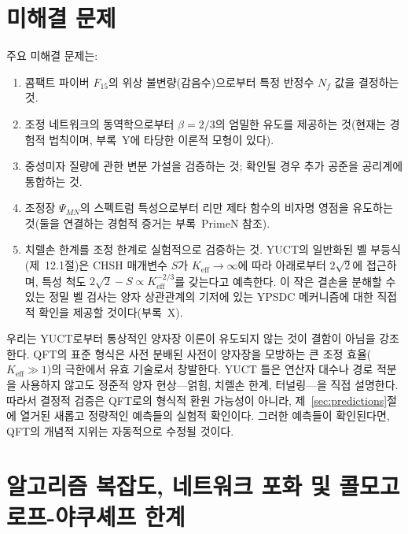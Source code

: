 \documentclass[12pt,a4paper]{article}
\theoremstyle{remark}
\begin{document}
	\section{미해결 문제}
	\label{sec:open}
	
	주요 미해결 문제는:
	
	\begin{enumerate}[label=(\roman*)]
		\item 콤팩트 파이버 \(F_{15}\)의 위상 불변량(감음수)으로부터 특정 반정수 \(N_f\) 값을 결정하는 것.
		\item 조정 네트워크의 동역학으로부터 \(\beta = 2/3\)의 엄밀한 유도를 제공하는 것(현재는 경험적 법칙이며, 부록~Y에 타당한 이론적 모형이 있다).
		\item 중성미자 질량에 관한 변분 가설을 검증하는 것; 확인될 경우 추가 공준을 공리계에 통합하는 것.
		\item 조정장 \(\Psi_{MN}\)의 스펙트럼 특성으로부터 리만 제타 함수의 비자명 영점을 유도하는 것(둘을 연결하는 경험적 증거는 부록~PrimeN 참조).
		\item 치렐손 한계를 조정 한계로 실험적으로 검증하는 것. YUCT의 일반화된 벨 부등식(제~12.1절)은 CHSH 매개변수 \(S\)가 \(K_{\mathrm{eff}} \to \infty\)에 따라 아래로부터 \(2\sqrt{2}\)에 접근하며, 특성 척도 \(2\sqrt{2} - S \propto K_{\mathrm{eff}}^{-2/3}\)를 갖는다고 예측한다. 이 작은 결손을 분해할 수 있는 정밀 벨 검사는 양자 상관관계의 기저에 있는 YPSDC 메커니즘에 대한 직접적 확인을 제공할 것이다(부록~X).
	\end{enumerate}
	
	우리는 YUCT로부터 통상적인 양자장 이론이 유도되지 않는 것이 결함이 아님을 강조한다. QFT의 표준 형식은 사전 분배된 사전이 양자장을 모방하는 큰 조정 효율(\(K_{\mathrm{eff}} \gg 1\))의 극한에서 유효 기술로서 창발한다. YUCT 틀은 연산자 대수나 경로 적분을 사용하지 않고도 정준적 양자 현상—얽힘, 치렐손 한계, 터널링—을 직접 설명한다. 따라서 결정적 검증은 QFT로의 형식적 환원 가능성이 아니라, 제~\ref{sec:predictions}절에 열거된 새롭고 정량적인 예측들의 실험적 확인이다. 그러한 예측들이 확인된다면, QFT의 개념적 지위는 자동적으로 수정될 것이다.
	
	\sloppy
	\section{알고리즘 복잡도, 네트워크 포화 및 콜모고로프-야쿠셰프 한계}
	\label{sec:complexity}
	
\end{document}
